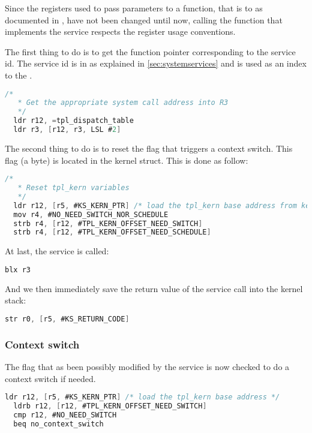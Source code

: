 Since the registers used to pass parameters to a function, that is  to  as documented in \cite{PCSAA}, have not been changed until now, calling the function that implements the service respects the register usage conventions.

The first thing to do is to get the function pointer corresponding to the service id. The service id is in  as explained in \ref{sec:systemservices} and is used as an index to the .

\begin{lstlisting}[language=C]
  /*
   * Get the appropriate system call address into R3
   */
  ldr r12, =tpl_dispatch_table
  ldr r3, [r12, r3, LSL #2]
\end{lstlisting}

The second thing to do is to reset the  flag that triggers a context switch. This flag (a byte) is located in the  kernel struct. This is done as follow:

\begin{lstlisting}[language=C]
  /*
   * Reset tpl_kern variables
   */
  ldr r12, [r5, #KS_KERN_PTR] /* load the tpl_kern base address from kernel stack */
  mov r4, #NO_NEED_SWITCH_NOR_SCHEDULE
  strb r4, [r12, #TPL_KERN_OFFSET_NEED_SWITCH]
  strb r4, [r12, #TPL_KERN_OFFSET_NEED_SCHEDULE]
\end{lstlisting}

At last, the service is called:

\begin{lstlisting}[language=C]
  blx r3
\end{lstlisting}

And we then immediately save the return value of the service call into the kernel stack:
\begin{lstlisting}[language=C]
  str r0, [r5, #KS_RETURN_CODE]
\end{lstlisting}

\subsubsection{Context switch}

The  flag that as been possibly modified by the service is now checked to do a context switch if needed.

\begin{lstlisting}[language=C]
  ldr r12, [r5, #KS_KERN_PTR] /* load the tpl_kern base address */
  ldrb r12, [r12, #TPL_KERN_OFFSET_NEED_SWITCH]
  cmp r12, #NO_NEED_SWITCH
  beq no_context_switch
\end{lstlisting}

